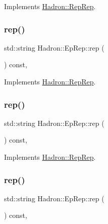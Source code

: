 Implements \mbox{\hyperlink{structHadron_1_1RepRep_ab3213025f6de249f7095892109575fde}{Hadron\+::\+Rep\+Rep}}.

\mbox{\label{structHadron_1_1EpRep_aa5a9f64d0578ca4e2ba9abce86d06bd6}} 
\subsubsection{\texorpdfstring{rep()}{rep()}\hspace{0.1cm}{\footnotesize\ttfamily [3/5]}}
{\footnotesize\ttfamily std\+::string Hadron\+::\+Ep\+Rep\+::rep (\begin{DoxyParamCaption}{ }\end{DoxyParamCaption}) const\hspace{0.3cm}{\ttfamily [inline]}, {\ttfamily [virtual]}}



Implements \mbox{\hyperlink{structHadron_1_1RepRep_ab3213025f6de249f7095892109575fde}{Hadron\+::\+Rep\+Rep}}.

\mbox{\label{structHadron_1_1EpRep_aa5a9f64d0578ca4e2ba9abce86d06bd6}} 
\subsubsection{\texorpdfstring{rep()}{rep()}\hspace{0.1cm}{\footnotesize\ttfamily [4/5]}}
{\footnotesize\ttfamily std\+::string Hadron\+::\+Ep\+Rep\+::rep (\begin{DoxyParamCaption}{ }\end{DoxyParamCaption}) const\hspace{0.3cm}{\ttfamily [inline]}, {\ttfamily [virtual]}}



Implements \mbox{\hyperlink{structHadron_1_1RepRep_ab3213025f6de249f7095892109575fde}{Hadron\+::\+Rep\+Rep}}.

\mbox{\label{structHadron_1_1EpRep_aa5a9f64d0578ca4e2ba9abce86d06bd6}} 
\subsubsection{\texorpdfstring{rep()}{rep()}\hspace{0.1cm}{\footnotesize\ttfamily [5/5]}}
{\footnotesize\ttfamily std\+::string Hadron\+::\+Ep\+Rep\+::rep (\begin{DoxyParamCaption}{ }\end{DoxyParamCaption}) const\hspace{0.3cm}{\ttfamily [inline]}, {\ttfamily [virtual]}}




